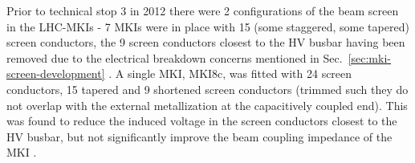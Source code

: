 Prior to technical stop 3 in 2012 there were 2 configurations of the beam screen in the LHC-MKIs - 7 MKIs were in place with 15 (some staggered, some tapered) screen conductors, the 9 screen conductors closest to the HV busbar having been removed due to the electrical breakdown concerns mentioned in Sec.~\ref{sec:mki-screen-development} \cite{Barnes:improvBeamScreen}. A single MKI, MKI8c, was fitted with 24 screen conductors, 15 tapered and 9 shortened screen conductors (trimmed such they do not overlap with the external metallization at the capacitively coupled end). This was found to reduce the induced voltage in the screen conductors closest to the HV busbar, but not significantly improve the beam coupling impedance of the MKI \cite{Barnes:improvBeamScreen}.
